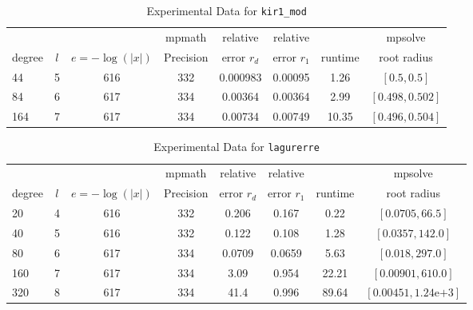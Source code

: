 \documentclass[sigconf]{acmart}
\begin{document}
\begin{table}[t]
\caption{Experimental Data for \texttt{kir1\_mod}} %
\label{tab:kir1_mod}
\vskip -0.15in
\begin{center}
\begin{small}
\begin{sc}
\begin{tabular}{lccccccc}
\toprule
&  &  & mpmath & relative  & relative &  & mpsolve \\
degree  & $l$& $e=-\log(|x|)$& Precision &error $r_d$       & error $r_1$ &runtime& root radius\\
\midrule
 44 & 5 & 616 & 332 & 0.000983 & 0.00095 & 1.26 & $[0.5, 0.5]$\\
 84 & 6 & 617 & 334 & 0.00364 & 0.00364 & 2.99 & $[0.498, 0.502]$\\
 164 & 7 & 617 & 334 & 0.00734 & 0.00749 & 10.35 & $[0.496, 0.504]$\\ %
\bottomrule
\end{tabular}
\end{sc}
\end{small}
\end{center}
\vskip 0.05in
\end{table}


\begin{table}[t]
\caption{Experimental Data for \texttt{lagurerre}} %
\label{tab:lagurerre}
\vskip -0.15in
\begin{center}
\begin{small}
\begin{sc}
\begin{tabular}{lccccccc}
\toprule
&  &  & mpmath & relative  & relative &  & mpsolve \\
degree  & $l$& $e=-\log(|x|)$& Precision &error $r_d$       & error $r_1$ &runtime& root radius\\
\midrule
 20 & 4 & 616 & 332 & 0.206 & 0.167 & 0.22 & $[0.0705, 66.5]$\\
 40 & 5 & 616 & 332 & 0.122 & 0.108 & 1.28 & $[0.0357, 142.0]$\\
 80 & 6 & 617 & 334 & 0.0709 & 0.0659 & 5.63 & $[0.018, 297.0]$\\
 160 & 7 & 617 & 334 & 3.09 & 0.954 & 22.21 & $[0.00901, 610.0]$\\
 320 & 8 & 617 & 334 & 41.4 & 0.996 & 89.64 & $[0.00451, 1.24\text{e+}3]$\\
\bottomrule
\end{tabular}
\end{sc}
\end{small}
\end{center}
\vskip 0.05in
\end{table}
\end{document}
